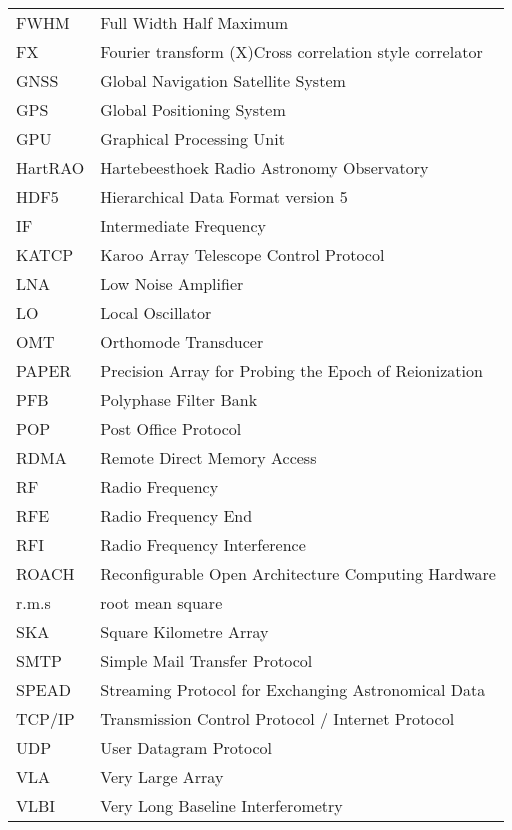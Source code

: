 \begin{table}
\begin{tabular}{ll}
FWHM & Full Width Half Maximum \\
FX & Fourier transform (X)Cross correlation style correlator\\
GNSS & Global Navigation Satellite System\\
GPS & Global Positioning System \\
GPU & Graphical Processing Unit \\
HartRAO & Hartebeesthoek Radio Astronomy Observatory\\
HDF5 & Hierarchical Data Format version 5\\
IF & Intermediate Frequency\\
KATCP & Karoo Array Telescope Control Protocol\\
LNA & Low Noise Amplifier \\
LO & Local Oscillator \\
OMT & Orthomode Transducer\\
PAPER & Precision Array for Probing the Epoch of Reionization \\
PFB & Polyphase Filter Bank \\
POP & Post Office Protocol \\
RDMA & Remote Direct Memory Access \\
RF & Radio Frequency\\
RFE & Radio Frequency End \\
RFI & Radio Frequency Interference \\
ROACH & Reconfigurable Open Architecture Computing Hardware\\ 
r.m.s & root mean square\\
SKA & Square Kilometre Array\\
SMTP & Simple Mail Transfer Protocol\\
SPEAD & Streaming Protocol for Exchanging Astronomical Data \\
TCP/IP & Transmission Control Protocol / Internet Protocol\\
UDP & User Datagram Protocol\\
VLA & Very Large Array \\
VLBI	  & Very Long Baseline Interferometry\\
\end{tabular}
\end{table}
